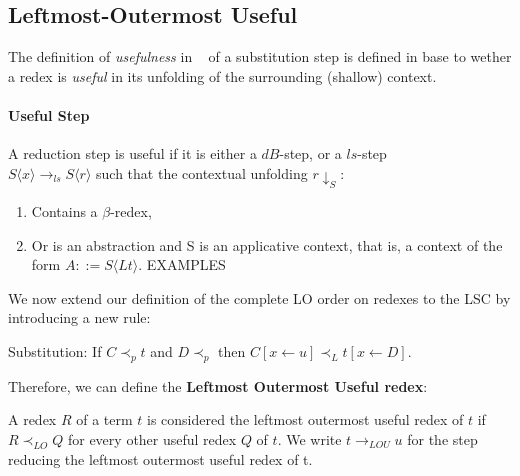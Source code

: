 \documentclass[11pt]{article}
\begin{document}
\subsection{Leftmost-Outermost Useful}\label{lou}
The definition of \textit{usefulness} in ~\cite{beta-invariance} of a substitution step is defined in base to wether a redex is \textit{useful} in its unfolding of the surrounding (shallow) context.
\paragraph{Useful Step} A reduction step is useful if it is either a $dB$-step, or a $ls$-step \\ $S\langle x \rangle \rightarrow_{ls} S\langle r \rangle$ such that the contextual unfolding $r \downarrow_S$:
\begin{enumerate}
  \item Contains a $\beta$-redex,
  \item Or is an abstraction and S is an applicative context, that is, a context of the form $A ::= S\langle Lt \rangle$.
        EXAMPLES
\end{enumerate}
We now extend our definition of the complete LO order on redexes to the LSC by introducing a new rule:
\begin{center}
  Substitution: If $C \prec_p t$ and $D \prec_p$ then $C[x \leftarrow u] \prec_L t[x \leftarrow D]$.
\end{center}
Therefore, we can define the \textbf{Leftmost Outermost Useful redex}:
\begin{center}
  A redex $R$ of a term $t$ is considered the leftmost outermost useful redex of $t$ if $R \prec_{LO} Q$ for every other useful redex $Q$ of $t$. We write $t \rightarrow_{LOU} u$ for the step reducing the leftmost outermost useful redex of t.
\end{center}
\end{document}
